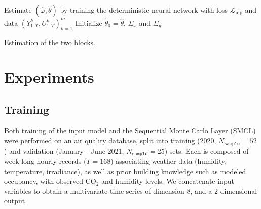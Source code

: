 \documentclass{article}
\begin{document}

\begin{algorithm}
	Estimate $(\widehat\varphi,\widehat\theta)$ by training the deterministic neural network with  loss $\mathcal{L}_{\mathrm{inp}}$ and data $(Y^k_{1:T},U^k_{1:T})_{k=1}^m$\;
	Initialize $\widetilde \theta_0 = \widehat \theta$, $\Sigma_x$ and $\Sigma_y$\;
	\caption{Estimation of the two blocks.}
	\label{algo:allsteps}
\end{algorithm}


\section{Experiments}
\label{sec:exp}

\subsection{Training}%
\label{sub:training}
Both training of the input model and the Sequential Monte Carlo Layer (SMCL) were performed on an air quality database, split into training (2020, $N_{\texttt{sample}}=52$) and validation (January - June 2021, $N_{\texttt{sample}}=25$) sets.
Each is composed of week-long hourly records ($T=168$) associating weather data (humidity, temperature, irradiance), as well as prior building knowledge such as modeled occupancy, with observed \ensuremath{\mathrm{CO_2}} and humidity levels.
We concatenate input variables to obtain a multivariate time series of dimension $8$, and a $2$ dimensional output.
\end{document}
